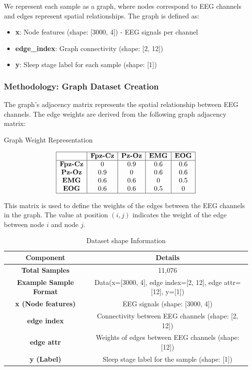 We represent each sample as a graph, where nodes correspond to EEG channels and edges represent spatial relationships. The graph is defined as:
\begin{itemize}
    \item \textbf{x}: Node features (shape: [3000, 4]) - EEG signals per channel
    \item \textbf{edge\_index}: Graph connectivity (shape: [2, 12])
    \item \textbf{y}: Sleep stage label for each sample (shape: [1])
\end{itemize}

\subsubsection{Methodology: Graph Dataset Creation}

The graph's adjacency matrix represents the spatial relationship between EEG channels. The edge weights are derived from the following graph adjacency matrix:

\begin{table}[h]
\centering
\caption{Graph Weight Representation}
\[
\begin{array}{|c|c|c|c|c|}
\hline
\textbf{} & \textbf{Fpz-Cz} & \textbf{Pz-Oz} & \textbf{EMG} & \textbf{EOG} \\
\hline
\textbf{Fpz-Cz} & 0 & 0.9 & 0.6 & 0.6 \\
\textbf{Pz-Oz}  & 0.9 & 0 & 0.6 & 0.6 \\
\textbf{EMG}    & 0.6 & 0.6 & 0 & 0.5 \\
\textbf{EOG}    & 0.6 & 0.6 & 0.5 & 0 \\
\hline
\end{array}
\]
\label{tab:correlation_matrix}
\end{table}


This matrix is used to define the weights of the edges between the EEG channels in the graph. The value at position \((i, j)\) indicates the weight of the edge between node \(i\) and node \(j\).

\begin{table}[ht]
\centering
\caption{Dataset shape Information}
\begin{tabular}{|c|c|}
\hline
\textbf{Component} & \textbf{Details} \\
\hline
\textbf{Total Samples} & 11,076 \\
\hline
\textbf{Example Sample Format} & Data(x=[3000, 4], edge index=[2, 12], edge attr=[12], y=[1]) \\
\hline
\textbf{x (Node features)} & EEG signals (shape: [3000, 4]) \\
\hline
\textbf{edge index} & Connectivity between EEG channels (shape: [2, 12]) \\
\hline
\textbf{edge attr} & Weights of edges between EEG channels (shape: [12]) \\
\hline
\textbf{y (Label)} & Sleep stage label for the sample (shape: [1]) \\
\hline
\end{tabular}

\end{table}


